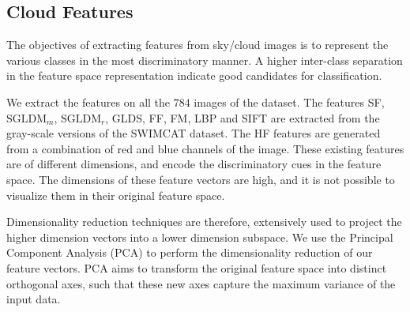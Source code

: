 \subsection{Cloud Features}
The objectives of extracting features from sky/cloud images is to represent the various classes in the most discriminatory manner. A higher inter-class separation in the feature space representation indicate good candidates for classification.

We extract the features on all the $784$ images of the dataset. The features SF, $\mbox{SGLDM}_m$, $\mbox{SGLDM}_r$, GLDS, FF, FM, LBP and SIFT are extracted from the gray-scale versions of the SWIMCAT dataset. The HF features are generated from a combination of red and blue channels of the image. These existing features are of different dimensions, and encode the discriminatory cues in the feature space. The dimensions of these feature vectors are high, and it is not possible to visualize them in their original feature space.


Dimensionality reduction techniques are therefore, extensively used to project the higher dimension vectors into a lower dimension subspace. We use the Principal Component Analysis (PCA) to perform the dimensionality reduction of our feature vectors. PCA aims to transform the original feature space into distinct orthogonal axes, such that these new axes capture the maximum variance of the input data. 

